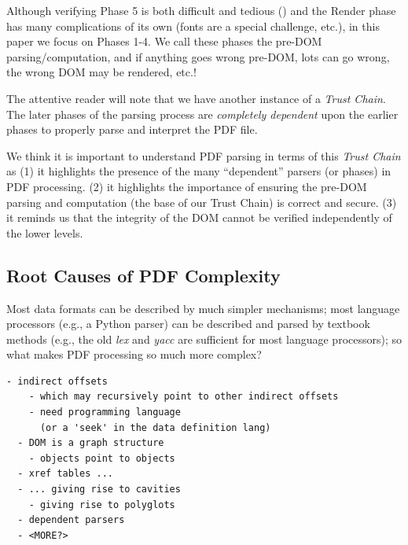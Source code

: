 Although verifying Phase 5 is both difficult and tedious
()
and the Render phase has many complications of its own (fonts are
a special challenge, etc.), in this paper we focus on Phases 1-4.
We call these phases the pre-DOM parsing/computation, and if anything
goes wrong pre-DOM, lots can go wrong, the wrong DOM may be rendered, etc.!

The attentive reader will note that we have another instance of a \emph{Trust
Chain}.  The later phases of the parsing process are \emph{completely
dependent} upon the earlier phases to properly parse and interpret the PDF
file.


We think it is important to understand PDF parsing in terms of this
\emph{Trust Chain} as
%
(1) it highlights the presence of the many ``dependent'' parsers (or phases)
in PDF processing.
%
(2) it highlights the importance of ensuring the pre-DOM parsing and
computation (the base of our Trust Chain) is correct and secure.
%
(3) it reminds us that the integrity of the DOM cannot be verified
independently of the lower levels.


\subsection{Root Causes of PDF Complexity}

Most data formats can be described by much simpler mechanisms;
most language processors (e.g., a Python parser) can be described and parsed by
textbook methods (e.g., the old \emph{lex} and \emph{yacc} are sufficient for
most language processors);
so what makes PDF processing so much more complex?
\begin{lstlisting}[style=meta]
  - indirect offsets
    - which may recursively point to other indirect offsets
    - need programming language
      (or a 'seek' in the data definition lang)
  - DOM is a graph structure
    - objects point to objects   
  - xref tables ...
  - ... giving rise to cavities
    - giving rise to polyglots
  - dependent parsers
  - <MORE?>
\end{lstlisting}


